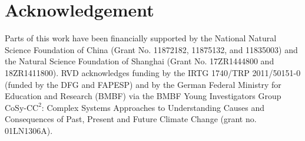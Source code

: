 \documentclass[12pt,aip,cha,reprint,nofootinbib]{revtex4-1}
\begin{document}
\section*{Acknowledgement}
Parts of this work have been financially supported by the National Natural Science Foundation of China (Grant No. 11872182, 11875132, and 11835003) and the Natural Science Foundation of Shanghai (Grant No. 17ZR1444800 and 18ZR1411800). RVD acknowledges funding by the IRTG 1740/TRP 2011/50151-0 (funded by the DFG and FAPESP) and by the German Federal Ministry for Education and Research (BMBF) via the BMBF Young Investigators Group $\text{CoSy-CC}^2$: Complex Systems Approaches to Understanding Causes and Consequences of Past, Present and Future Climate Change (grant no. 01LN1306A).

%

\end{document}
